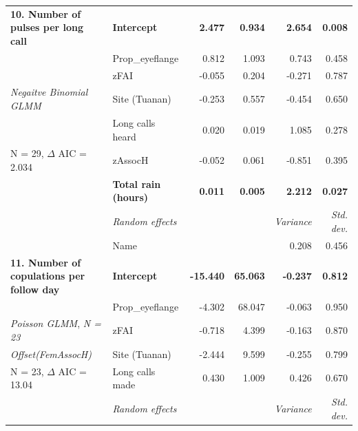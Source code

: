 \begin{table}
{\begin{tabular}{l l r r r r}
     \hline 

   \textbf{10. Number of pulses per long call} & \textbf{Intercept} & \textbf{2.477} & \textbf{0.934} & \textbf{2.654} & \textbf{0.008} \\

  & Prop\_eyeflange & 0.812 & 1.093 & 0.743 & 0.458 \\
   
   & zFAI & -0.055 & 0.204 & -0.271 & 0.787\\
   
    \textit{Negaitve Binomial GLMM} & Site (Tuanan) & -0.253 & 0.557 & -0.454 & 0.650\\
    
  & Long calls heard & 0.020 & 0.019 & 1.085 & 0.278 \\
   
 N = 29, $\Delta$ AIC = 2.034  & zAssocH & -0.052 & 0.061 & -0.851 & 0.395\\
   
   & \textbf{Total rain (hours)} & \textbf{0.011} & \textbf{0.005} & \textbf{2.212} & \textbf{0.027}\\
   
    \cline{2-6}
    
        & \textit{Random effects} & & & \textit{Variance} & \textit{Std. dev.}\\
        
    \cline{2-6} 
    
    & Name & & & 0.208 & 0.456 \\

     \hline 
   \textbf{11. Number of copulations per follow day} & \textbf{Intercept} & \textbf{-15.440} & \textbf{65.063} & \textbf{-0.237} & \textbf{0.812} \\

   & Prop\_eyeflange & -4.302 & 68.047 & -0.063 & 0.950 \\
   
   \textit{Poisson GLMM}, \textit{N = 23} & zFAI & -0.718 & 4.399 & -0.163 & 0.870\\
   
  \textit{Offset(FemAssocH)}  & Site (Tuanan) & -2.444 & 9.599 & -0.255 & 0.799\\
    
  N = 23, $\Delta$ AIC = 13.04  & Long calls made & 0.430 & 1.009 & 0.426 & 0.670 \\
      
    \cline{2-6}
    
        & \textit{Random effects} & & & \textit{Variance} & \textit{Std. dev.}\\
        

\end{tabular}}
\end{table}
